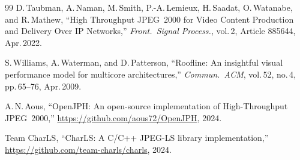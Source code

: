 \documentclass[journal]{IEEEtran}
\begin{document}
\begin{thebibliography}{99}
D.\,Taubman, A.\,Naman, M.\,Smith, P.-A.\,Lemieux, H.\,Saadat, O.\,Watanabe,
and R.\,Mathew,
``High Throughput JPEG~2000 for Video Content Production and Delivery Over IP
Networks,''
\textit{Front.\ Signal Process.}, vol.\,2, Article 885644, Apr.\,2022.

S.\,Williams, A.\,Waterman, and D.\,Patterson,
``Roofline: An insightful visual performance model for multicore
architectures,''
\textit{Commun.\ ACM}, vol.\,52, no.\,4, pp.\,65--76, Apr.\,2009.

A.\,N.\,Aous,
``OpenJPH: An open-source implementation of High-Throughput JPEG~2000,''
\url{https://github.com/aous72/OpenJPH}, 2024.

Team CharLS,
``CharLS: A C/C++ JPEG-LS library implementation,''
\url{https://github.com/team-charls/charls}, 2024.


\end{thebibliography}
\end{document}

